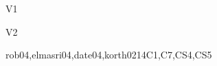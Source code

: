 \begin{syllabus}
\begin{competences}{V1}
    \item {} 
    \item {}
    \item {}
    \item {}
    \item {}
\end{competences}

\begin{competences}{V2}
    \item {} 
    \item {}
    \item {}
    \item {}
    \item {}
\end{competences}

\begin{unit}{\IMDatabaseSystems}{}{rob04,elmasri04,date04,korth02}{14}{C1,C7,CS4,CS5}
\begin{topics}
      \item \IMDatabaseSystemsTopicApproaches
      \item \IMDatabaseSystemsTopicComponents
      \item \IMDatabaseSystemsTopicDesign
      \item \IMDatabaseSystemsTopicDatabase
      \item \IMDatabaseSystemsTopicUse 
      \item \IMDatabaseSystemsTopicSystems
      \item \IMDatabaseSystemsTopicApproachesFor
\end{topics}
\begin{learningoutcomes}
    \item \IMDatabaseSystemsLOExplainTheDistinguish [\Usage]
    \item \IMDatabaseSystemsLODescribeTheDesigns [\Usage]
    \item \IMDatabaseSystemsLOCite [\Usage]
    \item \IMDatabaseSystemsLODescribeTheA [\Usage]
    \item \IMDatabaseSystemsLOIdentifyMajor [\Usage]
    \item \IMDatabaseSystemsLOExplainTheData [\Usage]
    \item \IMDatabaseSystemsLOUseALanguage [\Usage]
    \item \IMDatabaseSystemsLODescribeFacilities [\Usage]
    \item \IMDatabaseSystemsLODescribeMajor [\Usage]
\end{learningoutcomes}
\end{unit}


\end{syllabus}
